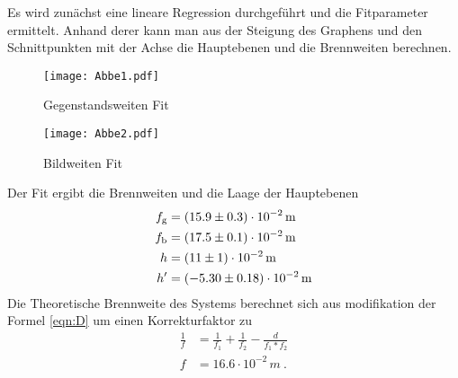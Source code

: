 Es wird zunächst eine lineare Regression durchgeführt und die Fitparameter ermittelt. Anhand derer kann man aus der Steigung des Graphens und den Schnittpunkten mit der Achse die Hauptebenen und die Brennweiten berechnen.
\begin{figure}
  \centering
    \texttt{[image: Abbe1.pdf]}
  \caption{Gegenstandsweiten Fit}
  \label{fig:<+label+>}
\end{figure}
\begin{figure}
  \centering
  \texttt{[image: Abbe2.pdf]}
  \caption{Bildweiten Fit}
  \label{fig:<+label+>}
\end{figure}
Der Fit ergibt die Brennweiten und die Laage der Hauptebenen
\begin{eqnarray}
  f_\text{g} &= (\num{ 15.9 +- 0.3}) \cdot 10^{-2} \, \text{m} \\ 
  f_\text{b} &= (\num{ 17.5 +- 0.1 }) \cdot 10^{-2} \, \text{m} \\
  h &= (\num{ 11 +- 1}) \cdot 10^{-2} \, \text{m} \\
  h' &= (\num{ -5.3 +- 0.18}) \cdot 10^{-2} \,\text{m} 
  \label{eqn:abbedf}
\end{eqnarray}
Die Theoretische Brennweite des Systems berechnet sich aus modifikation der Formel \ref{eqn:D} um einen Korrekturfaktor zu 
\begin{eqnarray}
  \frac{1}{f} &= \frac{1}{f_1} + \frac{1}{f_2} - \frac{d}{f_1 * f_2} \\
  f &= 16.6 \cdot 10^{-2} \, m \ .
  \label{tabbe}
\end{eqnarray}

